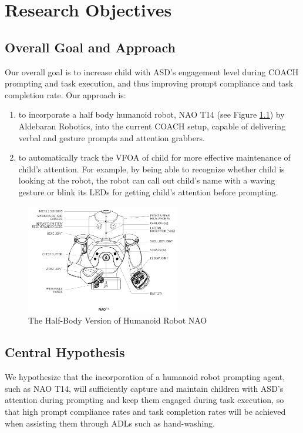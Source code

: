 \chapter{Research Objectives}

\section{Overall Goal and Approach}
Our overall goal is to increase child with ASD's engagement level during COACH prompting and task execution, and thus improving prompt compliance and task completion rate.  Our approach is:
\begin{enumerate}
	\item to incorporate a half body humanoid robot, NAO T14 (see Figure \ref{fig:HalfBodyNAO}) by Aldebaran Robotics, into the current COACH setup, capable of delivering verbal and gesture prompts and attention grabbers.
	
	\item to automatically track the VFOA of child for more effective maintenance of child's attention.  For example, by being able to recognize whether child is looking at the robot, the robot can call out child's name with a waving gesture or blink its LEDs for getting child's attention before prompting.
	
\end{enumerate}
\begin{figure} [h]
	\centering
	\includegraphics[width=0.6\textwidth]{./img/nao_t14_schema}
	\caption{The Half-Body Version of Humanoid Robot NAO}
	\label{fig:HalfBodyNAO}
\end{figure}


\section{Central Hypothesis}
We hypothesize that the incorporation of a humanoid robot prompting agent, such as NAO T14, will sufficiently capture and maintain children with ASD's attention during prompting and keep them engaged during task execution, so that high prompt compliance rates and task completion rates will be achieved when assisting them through ADLs such as hand-washing.


